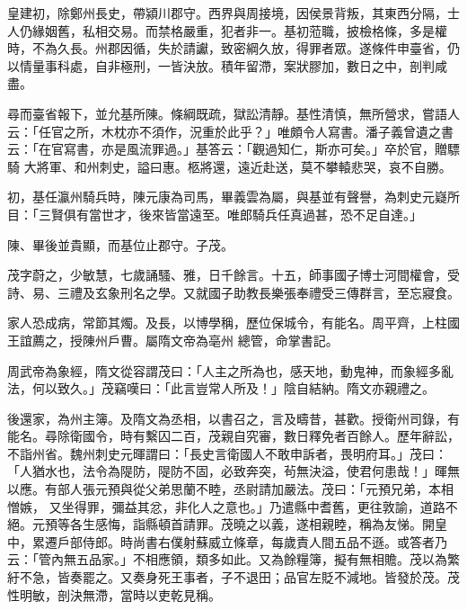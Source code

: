 \begin{pinyinscope}
 皇建初，除鄭州長史，帶潁川郡守。西界與周接境，因侯景背叛，其東西分隔，士人仍緣姻舊，私相交易。而禁格嚴重，犯者非一。基初蒞職，披檢格條，多是權時，不為久長。州郡因循，失於請讞，致密綱久放，得罪者眾。遂條件申臺省，仍以情量事科處，自非極刑，一皆決放。積年留滯，案狀膠加，數日之中，剖判咸盡。



 尋而臺省報下，並允基所陳。條綱既疏，獄訟清靜。基性清慎，無所營求，嘗語人云：「任官之所，木枕亦不須作，況重於此乎？」唯頗令人寫書。潘子義曾遺之書云：「在官寫書，亦是風流罪過。」基答云：「觀過知仁，斯亦可矣。」卒於官，贈驃騎
 大將軍、和州刺史，謚曰惠。柩將還，遠近赴送，莫不攀轅悲哭，哀不自勝。



 初，基任瀛州騎兵時，陳元康為司馬，畢義雲為屬，與基並有聲譽，為刺史元嶷所目：「三賢俱有當世才，後來皆當遠至。唯郎騎兵任真過甚，恐不足自達。」



 陳、畢後並貴顯，而基位止郡守。子茂。



 茂字蔚之，少敏慧，七歲誦騷、雅，日千餘言。十五，師事國子博士河間權會，受詩、易、三禮及玄象刑名之學。又就國子助教長樂張奉禮受三傳群言，至忘寢食。



 家人恐成病，常節其燭。及長，以博學稱，歷位保城令，有能名。周平齊，上柱國王誼薦之，授陳州戶曹。屬隋文帝為亳州
 總管，命掌書記。



 周武帝為象經，隋文從容謂茂曰：「人主之所為也，感天地，動鬼神，而象經多亂法，何以致久。」茂竊嘆曰：「此言豈常人所及！」陰自結納。隋文亦親禮之。



 後還家，為州主簿。及隋文為丞相，以書召之，言及疇昔，甚歡。授衛州司錄，有能名。尋除衛國令，時有繫囚二百，茂親自究審，數日釋免者百餘人。歷年辭訟，不詣州省。魏州刺史元暉謂曰：「長史言衛國人不敢申訴者，畏明府耳。」茂曰：「人猶水也，法令為隄防，隄防不固，必致奔突，茍無決溢，使君何患哉！」暉無以應。有部人張元預與從父弟思蘭不睦，丞尉請加嚴法。茂曰：「元預兄弟，本相憎嫉，
 又坐得罪，彌益其忿，非化人之意也。」乃遣縣中耆舊，更往敦諭，道路不絕。元預等各生感悔，詣縣頓首請罪。茂曉之以義，遂相親睦，稱為友悌。開皇中，累遷戶部侍郎。時尚書右僕射蘇威立條章，每歲責人間五品不遜。或答者乃云：「管內無五品家。」不相應領，類多如此。又為餘糧簿，擬有無相贍。茂以為繁紆不急，皆奏罷之。又奏身死王事者，子不退田；品官左貶不減地。皆發於茂。茂性明敏，剖決無滯，當時以吏乾見稱。




\end{pinyinscope}
